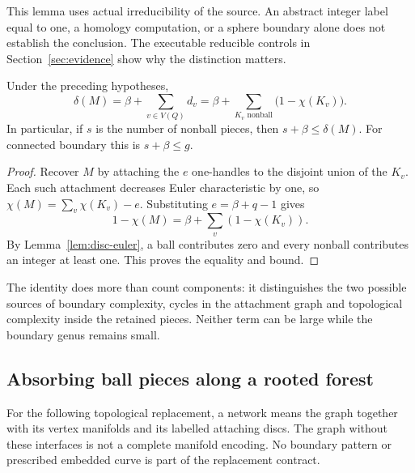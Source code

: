 This lemma uses actual irreducibility of the source.  An abstract integer
label equal to one, a homology computation, or a sphere boundary alone
does not establish the conclusion.  The executable reducible controls in
Section~\ref{sec:evidence} show why the distinction matters.

\begin{theorem}
\label{thm:genus-budget}
Under the preceding hypotheses,
\begin{equation}
 \boxed{\quad
 \delta(M)=\beta+\sum_{v\in V(Q)}d_v
          =\beta+\sum_{K_v\text{ nonball}}\bigl(1-\chi(K_v)\bigr).
 \quad}
 \label{eq:genus-budget}
\end{equation}
In particular, if $s$ is the number of nonball pieces, then
$s+\beta\leq\delta(M)$.  For connected boundary this is
$s+\beta\leq g$.
\end{theorem}
\begin{proof}
Recover $M$ by attaching the $e$ one-handles to the disjoint union of the
$K_v$.  Each such attachment decreases Euler characteristic by one, so
$\chi(M)=\sum_v\chi(K_v)-e$.  Substituting $e=\beta+q-1$ gives
\[
 1-\chi(M)=\beta+\sum_v(1-\chi(K_v)).
\]
By Lemma~\ref{lem:disc-euler}, a ball contributes zero and every nonball
contributes an integer at least one.  This proves the equality and bound.
\end{proof}

The identity does more than count components: it distinguishes the two
possible sources of boundary complexity, cycles in the attachment graph
and topological complexity inside the retained pieces.  Neither term can
be large while the boundary genus remains small.

\subsection{Absorbing ball pieces along a rooted forest}

For the following topological replacement, a network means the graph
together with its vertex manifolds and its labelled attaching discs.
The graph without these interfaces is not a complete manifold encoding.
No boundary pattern or prescribed embedded curve is part of the replacement
contract.

